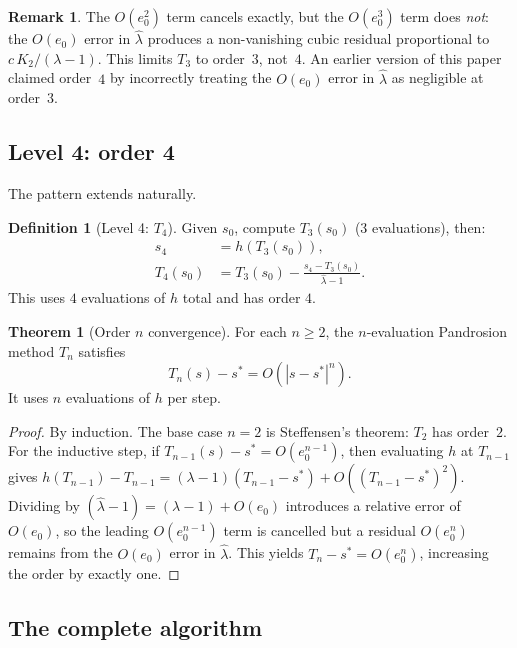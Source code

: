 \documentclass[11pt,a4paper]{article}
\theoremstyle{definition}
\newtheorem{definition}{Definition}[section]
\newtheorem{theorem}{Theorem}[section]
\newtheorem{remark}{Remark}[section]
\begin{document}
\begin{remark}
The $O(e_0^2)$ term cancels exactly, but the $O(e_0^3)$ term does \emph{not}: the $O(e_0)$ error in $\hat{\lambda}$ produces a non-vanishing cubic residual proportional to $c\,K_2/(\lambda - 1)$.  This limits $T_3$ to order~$3$, not~$4$.  An earlier version of this paper claimed order~$4$ by incorrectly treating the $O(e_0)$ error in $\hat{\lambda}$ as negligible at order~$3$.
\end{remark}

\subsection{Level 4: order 4}

The pattern extends naturally.

\begin{definition}[Level 4: $T_4$]
\label{def:T4}
Given $s_0$, compute $T_3(s_0)$ (3 evaluations), then:
\begin{align}
  s_4 &= h(T_3(s_0)), \label{eq:t4_s4} \\
  T_4(s_0) &= T_3(s_0) - \frac{s_4 - T_3(s_0)}{\hat{\lambda} - 1}. \label{eq:t4}
\end{align}
This uses $4$ evaluations of $h$ total and has order $4$.
\end{definition}

\begin{theorem}[Order $n$ convergence]
\label{thm:general}
For each $n \geq 2$, the $n$-evaluation Pandrosion method $T_n$ satisfies
\[
  T_n(s) - s^* = O(|s - s^*|^{n}).
\]
It uses $n$ evaluations of $h$ per step.
\end{theorem}

\begin{proof}
By induction.  The base case $n=2$ is Steffensen's theorem: $T_2$ has order~$2$.  For the inductive step, if $T_{n-1}(s) - s^* = O(e_0^{n-1})$, then evaluating $h$ at $T_{n-1}$ gives $h(T_{n-1}) - T_{n-1} = (\lambda - 1)(T_{n-1} - s^*) + O((T_{n-1}-s^*)^2)$.  Dividing by $(\hat{\lambda} - 1) = (\lambda - 1) + O(e_0)$ introduces a relative error of $O(e_0)$, so the leading $O(e_0^{n-1})$ term is cancelled but a residual $O(e_0^{n})$ remains from the $O(e_0)$ error in $\hat{\lambda}$.  This yields $T_n - s^* = O(e_0^{n})$, increasing the order by exactly one.
\end{proof}

\subsection{The complete algorithm}
\end{document}
